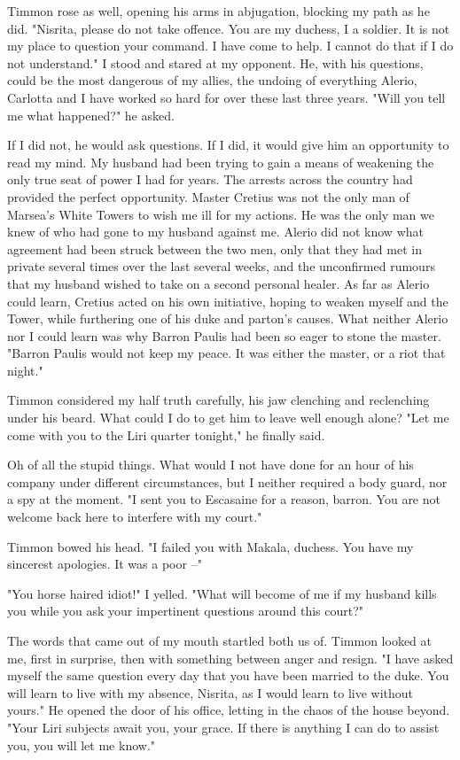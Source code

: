 \documentclass{article}
\begin{document}
Timmon rose as well, opening his arms in abjugation, blocking my path as he did. "Nisrita, please do not take offence. You are my duchess, I a soldier. It is not my place to question your command. I have come to help. I cannot do that if I do not understand." I stood and stared at my opponent. He, with his questions, could be the most dangerous of my allies, the undoing of everything Alerio, Carlotta and I have worked so hard for over these last three years. 
"Will you tell me what happened?" he asked.

If I did not, he would ask questions. If I did, it would give him an opportunity to read my mind. My husband had been trying to gain a means of weakening the only true seat of power I had for years. The arrests across the country had provided the perfect opportunity. Master Cretius was not the only man of Marsea's White Towers to wish me ill for my actions. He was the only man we knew of who had gone to my husband against me. Alerio did not know what agreement had been struck between the two men, only that they had met in private several times over the last several weeks, and the unconfirmed rumours that my husband wished to take on a second personal healer. As far as Alerio could learn, Cretius acted on his own initiative, hoping to weaken myself and the Tower, while furthering one of his duke and parton's causes. What neither Alerio nor I could learn was why Barron Paulis had been so eager to stone the master. "Barron Paulis would not keep my peace. It was either the master, or a riot that night."

Timmon considered my half truth carefully, his jaw clenching and reclenching under his beard. What could I do to get him to leave well enough alone? "Let me come with you to the Liri quarter tonight," he finally said.

Oh of all the stupid things. What would I not have done for an hour of his company under different circumstances, but I neither required a body guard, nor a spy at the moment. "I sent you to Escasaine for a reason, barron. You are not welcome back here to interfere with my court."

Timmon bowed his head. "I failed you with Makala, duchess. You have my sincerest apologies. It was a poor --"

"You horse haired idiot!" I yelled. "What will become of me if my husband kills you while you ask your impertinent questions around this court?"

The words that came out of my mouth startled both us of. Timmon looked at me, first in surprise, then with something between anger and resign. "I have asked myself the same question every day that you have been married to the duke. You will learn to live with my absence, Nisrita, as I would learn to live without yours." He opened the door of his office, letting in the chaos of the house beyond. "Your Liri subjects await you, your grace. If there is anything I can do to assist you, you will let me know."
\end{document}
